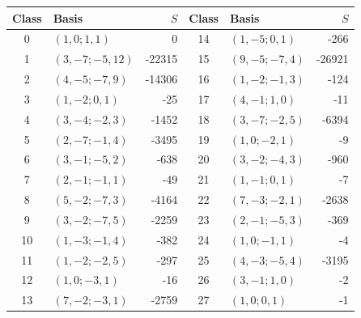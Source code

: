 \begin{center}\small
\begin{tabular}{clr@{\qquad}clr}
\toprule
Class & Basis & \(S\) & Class & Basis & \(S\)\\
\midrule
0 & \((1,0;1,1)\) & 0 & 14 & \((1,-5;0,1)\) & -266\\
1 & \((3,-7;-5,12)\) & -22315 & 15 & \((9,-5;-7,4)\) & -26921\\
2 & \((4,-5;-7,9)\) & -14306 & 16 & \((1,-2;-1,3)\) & -124\\
3 & \((1,-2;0,1)\) & -25 & 17 & \((4,-1;1,0)\) & -11\\
4 & \((3,-4;-2,3)\) & -1452 & 18 & \((3,-7;-2,5)\) & -6394\\
5 & \((2,-7;-1,4)\) & -3495 & 19 & \((1,0;-2,1)\) & -9\\
6 & \((3,-1;-5,2)\) & -638 & 20 & \((3,-2;-4,3)\) & -960\\
7 & \((2,-1;-1,1)\) & -49 & 21 & \((1,-1;0,1)\) & -7\\
8 & \((5,-2;-7,3)\) & -4164 & 22 & \((7,-3;-2,1)\) & -2638\\
9 & \((3,-2;-7,5)\) & -2259 & 23 & \((2,-1;-5,3)\) & -369\\
10 & \((1,-3;-1,4)\) & -382 & 24 & \((1,0;-1,1)\) & -4\\
11 & \((1,-2;-2,5)\) & -297 & 25 & \((4,-3;-5,4)\) & -3195\\
12 & \((1,0;-3,1)\) & -16 & 26 & \((3,-1;1,0)\) & -2\\
13 & \((7,-2;-3,1)\) & -2759 & 27 & \((1,0;0,1)\) & -1\\
\bottomrule
\end{tabular}
\end{center}
